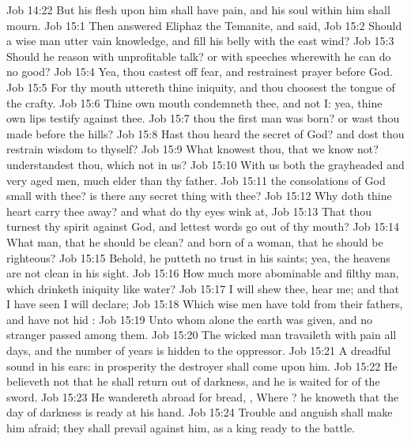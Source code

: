 \vs Job 14:22 But his flesh upon him shall have pain, and his soul within him shall mourn.
\vs Job 15:1 Then answered Eliphaz the Temanite, and said,
\vs Job 15:2 Should a wise man utter vain knowledge, and fill his belly with the east wind?
\vs Job 15:3 Should he reason with unprofitable talk? or with speeches wherewith he can do no good?
\vs Job 15:4 Yea, thou castest off fear, and restrainest prayer before God.
\vs Job 15:5 For thy mouth uttereth thine iniquity, and thou choosest the tongue of the crafty.
\vs Job 15:6 Thine own mouth condemneth thee, and not I: yea, thine own lips testify against thee.
\vs Job 15:7  thou the first man  was born? or wast thou made before the hills?
\vs Job 15:8 Hast thou heard the secret of God? and dost thou restrain wisdom to thyself?
\vs Job 15:9 What knowest thou, that we know not?  understandest thou, which  not in us?
\vs Job 15:10 With us  both the grayheaded and very aged men, much elder than thy father.
\vs Job 15:11  the consolations of God small with thee? is there any secret thing with thee?
\vs Job 15:12 Why doth thine heart carry thee away? and what do thy eyes wink at,
\vs Job 15:13 That thou turnest thy spirit against God, and lettest  words go out of thy mouth?
\vs Job 15:14 What  man, that he should be clean? and  born of a woman, that he should be righteous?
\vs Job 15:15 Behold, he putteth no trust in his saints; yea, the heavens are not clean in his sight.
\vs Job 15:16 How much more abominable and filthy  man, which drinketh iniquity like water?
\vs Job 15:17 I will shew thee, hear me; and that  I have seen I will declare;
\vs Job 15:18 Which wise men have told from their fathers, and have not hid :
\vs Job 15:19 Unto whom alone the earth was given, and no stranger passed among them.
\vs Job 15:20 The wicked man travaileth with pain all  days, and the number of years is hidden to the oppressor.
\vs Job 15:21 A dreadful sound  in his ears: in prosperity the destroyer shall come upon him.
\vs Job 15:22 He believeth not that he shall return out of darkness, and he is waited for of the sword.
\vs Job 15:23 He wandereth abroad for bread, , Where ? he knoweth that the day of darkness is ready at his hand.
\vs Job 15:24 Trouble and anguish shall make him afraid; they shall prevail against him, as a king ready to the battle.
